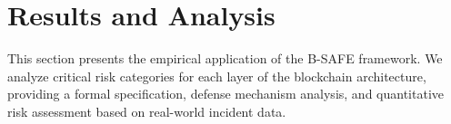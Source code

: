 \section{Results and Analysis}
\label{sec:results_and_analysis}

This section presents the empirical application of the B-SAFE framework. We analyze critical risk categories for each layer of the blockchain architecture, providing a formal specification, defense mechanism analysis, and quantitative risk assessment based on real-world incident data.






